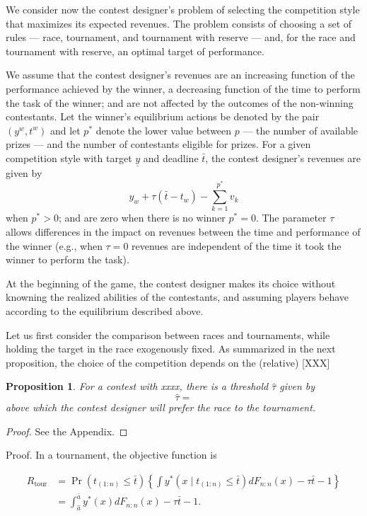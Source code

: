 \documentclass[11pt, titlepage]{article}
\newtheorem{proposition}{Proposition}
\newcommand\deadline{\bar{t}}
\newcommand\target{\underline{y}}
\newcommand\tournament{\text{tour}}
\newcommand\mtype{\hat{a}}
\newcommand\hitype{\bar{a}}
\begin{document}
We consider now the contest designer's problem of selecting the
competition style that maximizes its expected revenues. The problem
consists of choosing a set of rules --- race, tournament, and tournament
with reserve --- and, for the race and tournament with reserve, an
optimal target of performance.

We assume that the contest designer's revenues are an increasing
function of the performance achieved by the winner, a decreasing
function of the time to perform the task of the winner; and are not
affected by the outcomes of the non-winning contestants. Let the
winner's equilibrium actions be denoted by the pair \((y^w, t^w)\) and
let \(p^*\) denote the lower value between \(p\) --- the number of
available prizes --- and the number of contestants eligible for prizes.
For a given competition style with target \(\target\) and deadline
\(\deadline\), the contest designer's revenues are given by \[
    y_w + \tau (\deadline - t_w) - \sum_{k=1}^{p^*} v_k 
\] when \(p^*>0\); and are zero when there is no winner \(p^*=0\). The
parameter \(\tau\) allows differences in the impact on revenues between
the time and performance of the winner (e.g., when \(\tau=0\) revenues
are independent of the time it took the winner to perform the task).

At the beginning of the game, the contest designer makes its choice
without knowning the realized abilities of the contestants, and assuming
players behave according to the equilibrium described above.

Let us first consider the comparison between races and tournaments,
while holding the target in the race exogenously fixed. As summarized in
the next proposition, the choice of the competition depends on the
(relative) {[}XXX{]}

\begin{proposition}
For a contest with xxxx, there is a threshold $\hat\tau$ given by 
$$
 \hat\tau = 
$$
above which the contest designer will prefer the race to the tournament.
\end{proposition}

\begin{proof}
See the Appendix. 
\end{proof}

Proof. In a tournament, the objective function is

\begin{align}
R_\tournament & = \Pr(t_{(1:n)}\leq \deadline) \left\{\int y^*(x \mid t_{(1:n)}\leq \deadline) dF_{n:n}(x) - \tau \deadline - 1 \right\}  \nonumber\\
  & = \int_{\mtype}^{\hitype} y^*(x) dF_{n:n}(x) - \tau \deadline - 1. 
\end{align}
\end{document}
